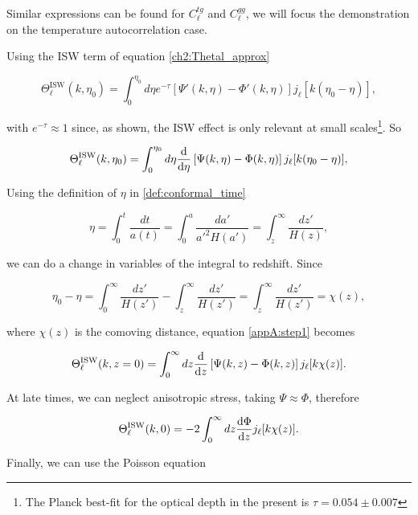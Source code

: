 \documentclass[openany,a4paper,12pt,oneside]{book}
\begin{document}
\begin{spacing}{1.5}
Similar expressions can be found for $C_\ell^{tg}$ and $C_\ell^{gg}$, we will focus the demonstration on the temperature autocorrelation case.

Using the ISW term of equation \eqref{ch2:Thetal_approx}

\begin{equation}
	\Theta_\ell^{\text{ISW}}(k,\eta_0)=\int_0^{\eta_0} d\eta e^{-\tau}[\Psi'(k,\eta)-\Phi'(k,\eta)]j_\ell[k(\eta_0-\eta)],
\end{equation}

\noindent with $e^{-\tau}\approx 1$ since, as shown, the ISW effect is only relevant at small scales\footnote{The Planck best-fit for the optical depth in the present is $\tau=0.054\pm 0.007$}. So

\begin{equation}\label{appA:step1}
	\Theta_\ell^{\text{ISW}}(k,\eta_0)=\int_0^{\eta_0} d\eta \dv{}{\eta}\left[\Psi(k,\eta)-\Phi(k,\eta)\right]j_\ell[k(\eta_0-\eta)],
\end{equation}

Using the definition of $\eta$ in \eqref{def:conformal_time}

\begin{equation}
	\eta=\int_0^t \frac{dt}{a(t)}=\int_0^a\frac{da'}{a'^2H(a')}=\int_{z}^\infty \frac{dz'}{H(z)},
\end{equation}

\noindent we can do a change in variables of the integral to redshift. Since

\begin{equation}
	\eta_0-\eta=\int_0^\infty \frac{dz'}{H(z')}-\int_z^\infty \frac{dz'}{H(z')}=\int_z^\infty \frac{dz'}{H(z')}=\chi(z),
\end{equation}

\noindent where $\chi(z)$ is the comoving distance, equation \eqref{appA:step1} becomes

\begin{equation}
	\Theta_\ell^\text{ISW}(k,z=0)=\int_0^\infty dz \dv{}{z}\left[\Psi(k,z)-\Phi(k,z)\right]j_\ell[k\chi(z)].
\end{equation}

At late times, we can neglect anisotropic stress, taking $\Psi\approx \Phi$, therefore

\begin{equation}
	\Theta_\ell^\text{ISW}(k,0)=-2\int_0^\infty dz \dv{\Phi}{z}j_\ell [k\chi(z)].
\end{equation}

Finally, we can use the Poisson equation


\end{spacing}
\end{document}
